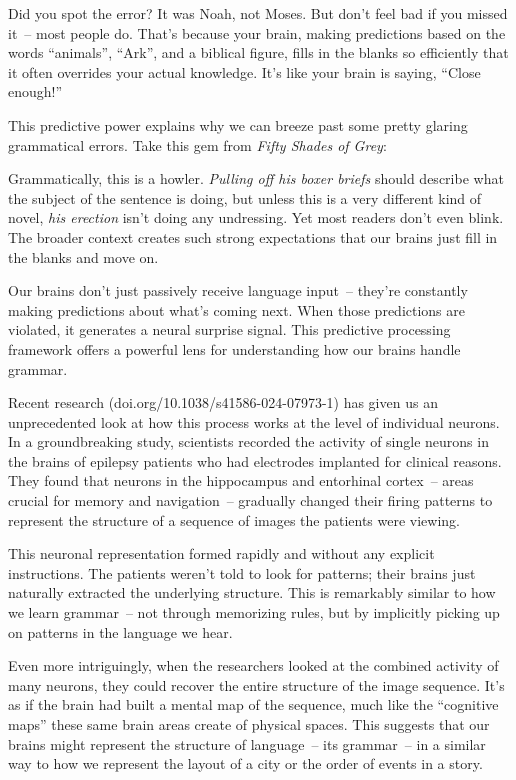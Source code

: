 Did you spot the error? It was Noah, not Moses. But don't feel bad if you missed it~-- most people do. That's because your brain, making predictions based on the words ``animals'', ``Ark'', and a biblical figure, fills in the blanks so efficiently that it often overrides your actual knowledge. It's like your brain is saying, ``Close enough!''

This predictive power explains why we can breeze past some pretty glaring grammatical errors. Take this gem from \textit{Fifty Shades of Grey}:

\label{ex:erection-neuro}
\z

Grammatically, this is a howler. \textit{Pulling off his boxer briefs} should describe what the subject of the sentence is doing, but unless this is a very different kind of novel, \textit{his erection} isn't doing any undressing. Yet most readers don't even blink. The broader context creates such strong expectations that our brains just fill in the blanks and move on.

Our brains don't just passively receive language input~-- they're constantly making predictions about what's coming next. When those predictions are violated, it generates a neural surprise signal. This predictive processing framework offers a powerful lens for understanding how our brains handle grammar.

Recent research (doi.org/10.1038/s41586-024-07973-1) has given us an unprecedented look at how this process works at the level of individual neurons. In a groundbreaking study, scientists recorded the activity of single neurons in the brains of epilepsy patients who had electrodes implanted for clinical reasons. They found that neurons in the hippocampus and entorhinal cortex~-- areas crucial for memory and navigation~-- gradually changed their firing patterns to represent the structure of a sequence of images the patients were viewing.

This neuronal representation formed rapidly and without any explicit instructions. The patients weren't told to look for patterns; their brains just naturally extracted the underlying structure. This is remarkably similar to how we learn grammar~-- not through memorizing rules, but by implicitly picking up on patterns in the language we hear.

Even more intriguingly, when the researchers looked at the combined activity of many neurons, they could recover the entire structure of the image sequence. It's as if the brain had built a mental map of the sequence, much like the ``cognitive maps'' these same brain areas create of physical spaces. This suggests that our brains might represent the structure of language~-- its grammar~-- in a similar way to how we represent the layout of a city or the order of events in a story.

